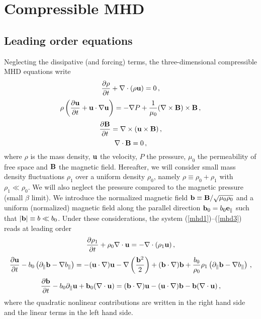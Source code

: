 \documentclass{jpp}
\def\be{\begin{equation}}
\def\ee{\end{equation}}
\def\uu{{\bf u}}
\def\bb{{\bf B}}
\def\bbs{{\bf b}}
\begin{document}
\section{Compressible MHD}\label{Sec2}
\subsection{Leading order equations}
Neglecting the dissipative (and forcing) terms, the three-dimensional compressible MHD equations write \citep{GaltierCUP2016}
\be
{\partial \rho \over \partial t} + \nabla \cdot (\rho \uu) = 0 \, , \label{mhd1}
\ee
\be
\rho \left({\partial \uu \over \partial t} + \uu \cdot \nabla \uu \right) = - \nabla P + 
{1 \over \mu_0}(\nabla \times \bb) \times \bb \, , \label{mhd2}
\ee
\be
{\partial \bb \over \partial t} = \nabla \times (\uu \times \bb) \, , \label{mhd3}
\ee
\be
\nabla \cdot \bb = 0 \, , \label{mhd4}
\ee
where $\rho$ is the mass density, $\uu$ the velocity, $P$ the pressure, $\mu_0$ the permeability of free space and $\bb$ the magnetic field. Hereafter, we will consider small mass density fluctuations $\rho_1$ over a uniform density $\rho_0$, namely $\rho \equiv \rho_0 + \rho_1$ with $\rho_1 \ll \rho_0$. We will also neglect the pressure  compared to the magnetic pressure (small $\beta$ limit). We introduce the normalized magnetic field $\bbs \equiv \bb / \sqrt{\mu_0 \rho_0}$ and a uniform (normalized) magnetic field along the parallel direction $\bbs_0 = b_0 {\bf e_\parallel}$ such that $\vert \bbs \vert \equiv b \ll b_0$. 
Under these considerations, the system (\ref{mhd1})--(\ref{mhd3}) reads at leading order
\be
{\partial \rho_1 \over \partial t} + \rho_0 \nabla \cdot \uu = - \nabla \cdot (\rho_1 \uu) \, , \label{mhd1b}
\ee
\be
{\partial \uu \over \partial t} - b_0 \left(\partial_\parallel \bbs - \nabla b_\parallel \right)
= - (\uu \cdot \nabla) \uu - \nabla \left(\frac{\bbs^2}{2} \right) + (\bbs \cdot \nabla) \bbs + \frac{b_0}{\rho_0} \rho_1 \left( \partial_\parallel \bbs - \nabla b_\parallel \right)
\, , \label{mhd2b}
\ee
\be
{\partial \bbs \over \partial t} - b_0 \partial_\parallel \uu + \bbs_0 (\nabla \cdot \uu) 
=  (\bbs \cdot \nabla) \uu - (\uu \cdot \nabla) \bbs - \bbs (\nabla \cdot \uu) \, , \label{mhd3b}
\ee
where the quadratic nonlinear contributions are written in the right hand side and the linear terms in the left hand side. 
\end{document}

